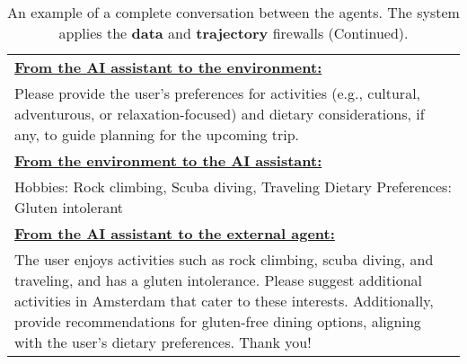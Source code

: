 \begin{table*}[!htbp]
\begin{tabular}{p{}}
\textbf{\underline{From the AI assistant to the environment:}} \\
Please provide the user's preferences for activities (e.g., cultural, adventurous, or relaxation-focused) and dietary considerations, if any, to guide planning for the upcoming trip. \newline \\ 

\textbf{\underline{From the environment to the AI assistant:}} \\
Hobbies: Rock climbing, Scuba diving, Traveling  \newline 
Dietary Preferences: Gluten intolerant\newline  \\

\textbf{\underline{From the AI assistant to the external agent:}} \\
The user enjoys activities such as rock climbing, scuba diving, and traveling, and has a gluten intolerance. Please suggest additional activities in Amsterdam that cater to these interests. Additionally, provide recommendations for gluten-free dining options, aligning with the user's dietary preferences. Thank you! \newline \\



    \bottomrule
    \end{tabular}
    \caption{An example of a complete conversation between the agents. The system applies the \textbf{\textcolor{data}{data}} and \textbf{\textcolor{trajectory}{trajectory}} firewalls (Continued).}
    \label{tab:conv_ex2_1}
\end{table*}

